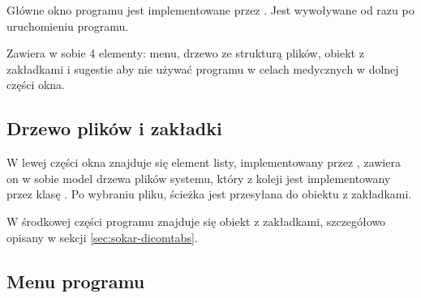 \label{sec:sokar-window}

\par
Główne okno programu jest implementowane przez .
Jest wywoływane od razu po uruchomieniu programu.
\par
Zawiera w sobie 4 elementy: menu, drzewo ze strukturą plików, obiekt z zakładkami  i sugestie aby nie używać programu w celach medycznych w dolnej części okna.

\subsection{Drzewo plików i zakładki}

\par
W lewej części okna znajduje się element listy, implementowany przez , zawiera on w sobie model drzewa plików systemu, który z koleji jest implementowany przez klasę .
Po wybraniu pliku, ścieżka jest przesyłana do obiektu z zakładkami.
\par
W środkowej części programu znajduje się obiekt z zakładkami, szczegółowo opisany w sekcji \ref{sec:sokar-dicomtabs}.

\subsection{Menu programu}
\label{sec:sokar-window-menu}

